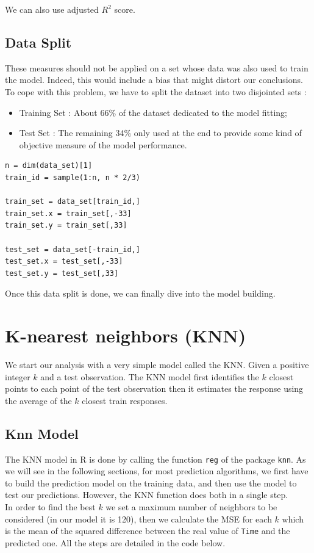 \documentclass[]{report}
\begin{document}
We can also use adjusted $R^2$ score.

\subsection{Data Split}
These measures should not be applied on a set whose data was also used to train the model. Indeed, this would include a bias that might distort our conclusions. To cope with this problem, we have to split the dataset into two disjointed sets : 
\begin{itemize}
	\item Training Set : About 66\% of the dataset dedicated to the model fitting;
	\item Test Set : The remaining 34\% only used at the end to provide some kind of objective measure of the model performance.
\end{itemize} 

\begin{lstlisting}
n = dim(data_set)[1]
train_id = sample(1:n, n * 2/3)

train_set = data_set[train_id,]
train_set.x = train_set[,-33]
train_set.y = train_set[,33]

test_set = data_set[-train_id,]
test_set.x = test_set[,-33]
test_set.y = test_set[,33]
\end{lstlisting}

Once this data split is done, we can finally dive into the model building.

\section{K-nearest neighbors (KNN)}
We start our analysis with a very simple model called the KNN.
Given a positive integer $k$ and a test observation. The KNN model first identifies the $k$ closest points to each point of the test observation then it estimates the response using the average of the $k$ closest train responses.\\ 

\subsection{Knn Model}
The KNN model in R is done by calling the function \texttt{reg} of the package \texttt{knn}. As we will see in the following sections, for most prediction algorithms, we first have to build the prediction model on the training data, and then use the model to test our predictions. However, the KNN function does both in a single step.\\ 
In order to find the best $k$ we set a maximum number of neighbors to be considered (in our model it is 120), then we calculate the MSE for each $k$ which is the mean of the squared difference between the real value of \texttt{Time} and the predicted one. All the steps are detailed in the code below.
\end{document}
